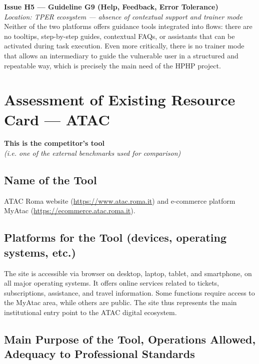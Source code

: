 ﻿\documentclass[11pt,a4paper]{article}
\begin{document}
\bigskip

\noindent\textbf{Issue H5 --- Guideline G9 (Help, Feedback, Error
Tolerance)}\label{iss:H5}\\
\textit{Location: TPER ecosystem --- absence of contextual
support and trainer mode}\\

\noindent Neither of the two platforms offers guidance tools
integrated into flows: there are no tooltips, step-by-step guides,
contextual FAQs, or assistants that can be activated during task execution.
Even more critically, there is no trainer mode that
allows an intermediary to guide the vulnerable user in a
structured and repeatable way, which is precisely the main need
of the HPHP project.

\newpage

\section{Assessment of Existing Resource Card --- ATAC}

\textbf{This is the competitor's tool}\\
\textit{(i.e. one of the external benchmarks used for comparison)}

\subsection*{Name of the Tool}

\noindent ATAC Roma website (\url{https://www.atac.roma.it}) and
e-commerce platform MyAtac (\url{https://ecommerce.atac.roma.it}).

\subsection*{Platforms for the Tool (devices, operating systems, etc.)}

\noindent The site is accessible via browser on desktop, laptop, tablet, and smartphone, on all major operating systems. It offers online services related to tickets, subscriptions, assistance, and travel information. Some functions require access to the MyAtac area, while others are public. The site thus represents the main institutional entry point to the ATAC digital ecosystem.

\subsection*{Main Purpose of the Tool, Operations Allowed, Adequacy to Professional Standards}
\end{document}
